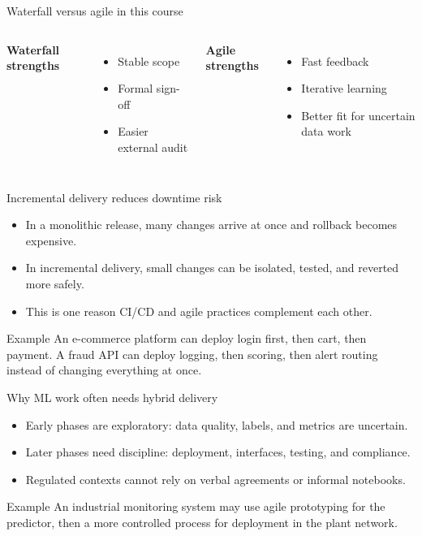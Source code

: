\begin{frame}{Waterfall versus agile in this course}
\begin{columns}[T]
\textbf{Waterfall strengths}
\begin{itemize}
\item Stable scope
\item Formal sign-off
\item Easier external audit
\end{itemize}
\textbf{Agile strengths}
\begin{itemize}
\item Fast feedback
\item Iterative learning
\item Better fit for uncertain data work
\end{itemize}
\end{columns}
\coursefooter
\end{frame}

\begin{frame}{Incremental delivery reduces downtime risk}
\begin{itemize}
\item In a monolithic release, many changes arrive at once and rollback becomes expensive.
\item In incremental delivery, small changes can be isolated, tested, and reverted more safely.
\item This is one reason CI/CD and agile practices complement each other.
\end{itemize}
\begin{block}{Example}
An e-commerce platform can deploy login first, then cart, then payment. A fraud API can deploy logging, then scoring, then alert routing instead of changing everything at once.
\end{block}
\coursefooter
\end{frame}

\begin{frame}{Why ML work often needs hybrid delivery}
\begin{itemize}
\item Early phases are exploratory: data quality, labels, and metrics are uncertain.
\item Later phases need discipline: deployment, interfaces, testing, and compliance.
\item Regulated contexts cannot rely on verbal agreements or informal notebooks.
\end{itemize}
\begin{block}{Example}
An industrial monitoring system may use agile prototyping for the predictor, then a more controlled process for deployment in the plant network.
\end{block}
\coursefooter
\end{frame}

